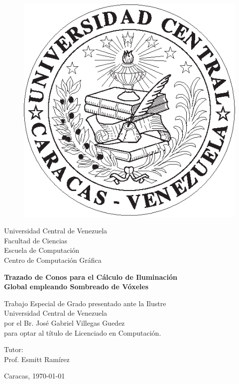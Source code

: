 \label{ch:portada}
\thispagestyle{empty}

\begin{figure}[t]
    \centering
    \includegraphics[height=0.15\textwidth]{media/logoucv.eps}
\end{figure}

\begin{center}
	Universidad Central de Venezuela\\
	Facultad de Ciencias\\
	Escuela de Computaci\'on\\
	Centro de Computaci\'on Gr\'afica\\
\end{center}
				
\vspace{2.5cm}

\begin{center}
	\large{\textbf{Trazado de Conos para el Cálculo de Iluminación\\ Global empleando Sombreado de Vóxeles}}
\end{center}
				
\vspace{2.5cm}

\begin{center}
    Trabajo Especial de Grado presentado ante la Ilustre\\
    Universidad Central de Venezuela \\
    por el Br. José Gabriel Villegas Guedez\\
    para optar al título de Licenciado en Computación.
\end{center}

\vspace{2.5cm}				
				
\begin{center}
	Tutor:\\
	Prof. Esmitt Ramírez
\end{center}
				
\vspace{\fill}

\begin{center}
	Caracas, \monthyeardate\today
\end{center}

\newpage
			